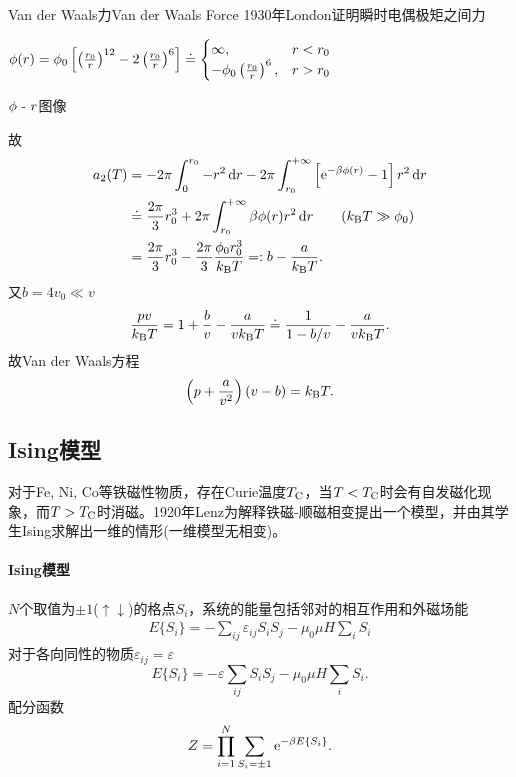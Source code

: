 \begin{example}{Van der Waals力}{Van der Waals Force}
	1930年London证明瞬时电偶极矩之间力
	\begin{center}
		\(\phi(r)=\phi_0\left[\left(\frac{r_0}r\right)^{12}-2\left(\frac{r_0}r\right)^6\right]\doteq\begin{cases}
			\infty,&r<r_0\\
			-\phi_0\left(\frac{r_0}r\right)^6,&r>r_0
		\end{cases}\)

		\tikzchap $\phi~\text{-}~ r$图像
	\end{center}
	故
	{\begin{align*}
		a_2(T)&=-2\pi\int_0^{r_0}-r^2\d r-2\pi\int_{r_0}^{+\infty}\fkh{\e{-\beta\phi(r)}-1}r^2\d r\\
		&\doteq\frac{2\pi}3r_0^3+2\pi\int_{r_0}^{+\infty}\beta\phi(r)r^2\d r\tag{$\kB T\gg\phi_0$}\\
		&=\frac{2\pi}3r_0^3-\frac{2\pi}3\frac{\phi_0r_0^3}{\kB T}=:b-\frac a{\kB T}.
	\end{align*}}
	又$b=4v_0\ll v$
	\[
		\frac{pv}{k_{\mathrm B} T}=1+\frac bv-\frac a{vk_{\mathrm B} T}\doteq\frac1{1-b/v}-\frac a{vk_{\mathrm B} T}.
	\]
	故Van der Waals方程
	\begin{align}
		\left(p+\frac a{v^2}\right)(v-b)=k_{\mathrm B} T.
	\end{align}
\end{example}
\subsection{Ising模型}
对于Fe, Ni, Co等铁磁性物质，存在Curie温度$T_\mathrm C$，当$T<T_\mathrm C$时会有自发磁化现象，而$T>T_\mathrm C$时消磁。1920年Lenz为解释铁磁-顺磁相变提出一个模型，并由其学生Ising求解出一维的情形(一维模型无相变)。

\paragraph*{Ising模型}$N$个取值为$\pm 1$($\uparrow\downarrow$)的格点$S_i$，系统的能量包括邻对的相互作用和外磁场能
\begin{align}
	E\{S_i\}=-\sum_{ij}\varepsilon_{ij}S_iS_j-\mu_0\mu H\sum_iS_i
\end{align}
对于各向同性的物质$\varepsilon_{ij}=\varepsilon$
\[
	E\{S_i\}=-\varepsilon\sum_{ij}S_iS_j-\mu_0\mu H\sum_iS_i.
\]
配分函数
\[
	Z=\prod_{i=1}^N\sum_{S_i=\pm 1}\mathop{}\!\mathrm{e}^{-\beta E\{S_i\}}.\]
